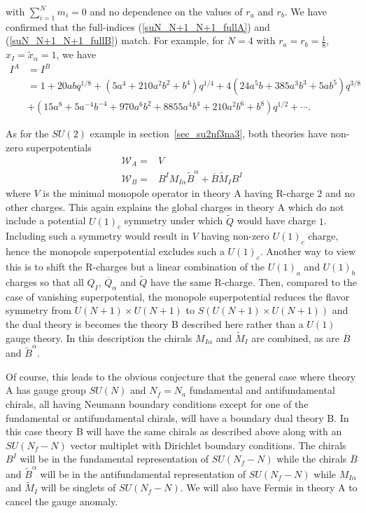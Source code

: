 \documentclass[12pt]{article}
\newcommand{\Wcal}{\mathcal{W}}
\numberwithin{equation}{section}
\begin{document}
with $\sum_{i=1}^N m_i = 0$ and no dependence on the values of $r_a$ and $r_b$.
We have confirmed that the full-indices 
(\ref{suN_N+1_N+1_fullA}) and (\ref{suN_N+1_N+1_fullB}) match. 
For example, for $N=4$ with $r_a=r_b=\frac18$, $x_I=\tilde{x}_{\alpha}=1$, 
we have
\begin{align}
I^A&=I^B
\nonumber\\
&=1+20abq^{1/8}
+(5a^4+210a^2b^2+b^4)q^{1/4}
+4(24a^5b+385a^3b^3+5ab^5)q^{3/8}\nonumber\\
&+(15a^8+5a^{-4}b^{-4}+970a^6b^2+8855a^4b^4+210a^2b^6+b^8)q^{1/2}
+\cdots.
\end{align}

As for the $SU(2)$ example in section~\ref{sec_su2nf3na3}, both theories have non-zero superpotentials
\begin{align}
    \Wcal_A = & V \\
    \Wcal_B = & B^I M_{I \alpha} \widetilde{B}^{\alpha} + \overline{B} \widetilde{M}_I B^I
\end{align}
where $V$ is the minimal monopole operator in theory A having R-charge $2$ and no other charges. This again explains the global charges in theory A which do not include a potential $U(1)_c$ symmetry under which $\widetilde{Q}$ would have charge $1$. Including such a symmetry would result in $V$ having non-zero $U(1)_c$ charge, hence the monopole superpotential excludes such a $U(1)_c$. Another way to view this is to shift the R-charges but a linear combination of the $U(1)_a$ and $U(1)_b$ charges so that all $Q_I$, $\overline{Q}_{\alpha}$ and $\widetilde{Q}$ have the same R-charge. Then, compared to the case of vanishing superpotential, the monopole superpotential reduces the flavor symmetry from $U(N+1) \times U(N+1)$ to $S(U(N+1) \times U(N+1))$ and the dual theory is becomes the theory B described here rather than a $U(1)$ gauge theory. In this description the chirals $M_{I \alpha}$ and $\widetilde{M}_I$ are combined, as are $\overline{B}$ and $\widetilde{B}^{\alpha}$.

Of course, this leads to the obvious conjecture that the general case where theory A has gauge group $SU(N)$ and $N_f = N_a$ fundamental and antifundamental chirals, all having Neumann boundary conditions except for one of the fundamental or antifundamental chirals, will have a boundary dual theory B. In this case theory B will have the same chirals as described above along with an $SU(N_f - N)$ vector multiplet with Dirichlet boundary conditions. The chirals $B^I$ will be in the fundamental representation of $SU(N_f - N)$ while the chirals $\overline{B}$ and $\widetilde{B}^{\alpha}$ will be in the antifundamental representation of $SU(N_f - N)$ while $M_{I \alpha}$ and $\widetilde{M}_I$ will be singlets of $SU(N_f - N)$. We will also have Fermis in theory A to cancel the gauge anomaly.
\end{document}
